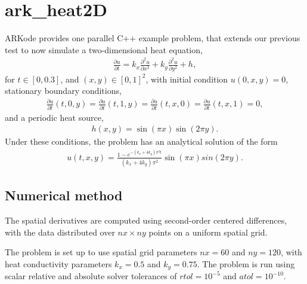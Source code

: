 \documentclass[letterpaper,10pt,english]{sphinxmanual}
\begin{document}
\section{ark\_heat2D}
\label{\detokenize{cpp_parallel:ark-heat2d}}\label{\detokenize{cpp_parallel:id1}}
ARKode provides one parallel C++ example problem, that extends our
previous {\hyperref[\detokenize{c_serial:ark-heat1d}]{}} test to now simulate a two-dimensional heat
equation,
\begin{equation*}
\begin{split}\frac{\partial u}{\partial t} = k_x \frac{\partial^2 u}{\partial x^2}
                              + k_y \frac{\partial^2 u}{\partial y^2} + h,\end{split}
\end{equation*}
for \(t \in [0, 0.3]\), and \((x,y) \in [0, 1]^2\), with initial
condition \(u(0,x,y) = 0\), stationary boundary conditions,
\begin{equation*}
\begin{split}\frac{\partial u}{\partial t}(t,0,y) = \frac{\partial u}{\partial t}(t,1,y) =
\frac{\partial u}{\partial t}(t,x,0) = \frac{\partial u}{\partial t}(t,x,1) = 0,\end{split}
\end{equation*}
and a periodic heat source,
\begin{equation*}
\begin{split}h(x,y) = \sin(\pi x) \sin(2\pi y).\end{split}
\end{equation*}
Under these conditions, the problem has an analytical solution of the
form
\begin{equation*}
\begin{split}u(t,x,y) = \frac{1 - e^{-(k_x+4k_y)\pi^2 t}}{(k_x+4k_y)\pi^2} \sin(\pi x) sin(2\pi y).\end{split}
\end{equation*}

\subsection{Numerical method}
\label{\detokenize{cpp_parallel:numerical-method}}
The spatial derivatives are computed using second-order centered
differences, with the data distributed over \(nx\times ny\) points
on a uniform spatial grid.

The problem is set up to use spatial grid parameters \(nx=60\) and
\(ny=120\), with heat conductivity parameters \(k_x=0.5\) and
\(k_y=0.75\).  The problem is run using scalar relative and
absolute solver tolerances of \(rtol=10^{-5}\) and
\(atol=10^{-10}\).
\end{document}
